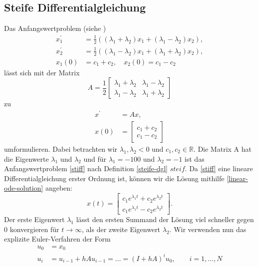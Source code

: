 \subsection{Steife Differentialgleichung}
\label{sec:steife-differentialgleichung}
Das Anfangswertproblem (siehe \cite[173]{stoerNumerischeMathematik2005})
\begin{align}
       \label{stiff}
       x_{1}^{\prime} &= \frac{1}{2} ((\lambda_1 + \lambda_2)x_1 + (\lambda_1 - \lambda_2)x_2), \nonumber \\
       x_{2}^{\prime} &= \frac{1}{2} ((\lambda_1 - \lambda_2)x_1 + (\lambda_1 + \lambda_2)x_2), \\
       x_1(0) &= c_1 + c_2, \quad x_2(0) = c_1 - c_2 \nonumber
\end{align}
lässt sich mit der Matrix
\[
       A = \frac{1}{2}
       \begin{bmatrix}
                \lambda_1 + \lambda_2 & \lambda_1 - \lambda_2 \\
                \lambda_1 - \lambda_2 & \lambda_1 + \lambda_2
       \end{bmatrix}
\]
zu
\begin{align*}
       x^{\prime} &= Ax, \\
       x(0) &=
       \begin{bmatrix}
              c_1 + c_2 \\
              c_1 - c_2
       \end{bmatrix}
\end{align*}
umformulieren. Dabei betrachten wir $\lambda_1, \lambda_2 < 0$ und $c_1, c_2 \in \mathbb{R}$. Die Matrix A hat die
Eigenwerte $\lambda_1$ und $\lambda_2$ und für $\lambda_1 = -100$ und $\lambda_2 = -1$ ist
das Anfangswertproblem \ref{stiff} nach Definition \eqref{steife-dgl} $steif$. Da \eqref{stiff} eine lineare
Differentialgleichung erster Ordnung ist, können wir die Lösung mithilfe \eqref{linear-ode-solution} angeben:
\[
       x(t) =
       \begin{bmatrix}
              c_1 e^{\lambda_1 t} + c_2 e^{\lambda_2 t} \\
              c_1 e^{\lambda_1 t} - c_2 e^{\lambda_2 t}
       \end{bmatrix}.
\]
Der erste Eigenwert $\lambda_1$ lässt den ersten Summand der Lösung viel schneller gegen $0$ konvergieren für
$t \rightarrow \infty$, als der zweite Eigenwert $\lambda_2$. Wir verwenden nun das explizite Euler-Verfahren der Form
\begin{align*}
       u_0 &= x_0 \\
       u_i &= u_{i-1} + hAu_{i-1}= \dots = (I + hA)^{i}u_0, \qquad i=1,\dots,N
\end{align*}
